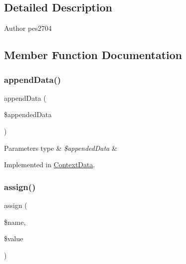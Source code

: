 \subsection{Detailed Description}
\begin{DoxyAuthor}{Author}
pes2704 
\end{DoxyAuthor}


\subsection{Member Function Documentation}
\mbox{\label{interface_pes_1_1_type_1_1_context_data_interface_a9ca70df7ea476fc99e323dd024495ddc}} 
\subsubsection{\texorpdfstring{append\+Data()}{appendData()}}
{\footnotesize\ttfamily append\+Data (\begin{DoxyParamCaption}\item[{}]{\$appended\+Data }\end{DoxyParamCaption})}


\begin{DoxyParams}[1]{Parameters}
type & {\em \$appended\+Data} & \\
\hline
\end{DoxyParams}


Implemented in \mbox{\hyperlink{class_pes_1_1_type_1_1_context_data_a9ca70df7ea476fc99e323dd024495ddc}{Context\+Data}}.

\mbox{\label{interface_pes_1_1_type_1_1_context_data_interface_ac151b5fc880911b525ed71fd25806f62}} 
\subsubsection{\texorpdfstring{assign()}{assign()}}
{\footnotesize\ttfamily assign (\begin{DoxyParamCaption}\item[{}]{\$name,  }\item[{}]{\$value }\end{DoxyParamCaption})}


